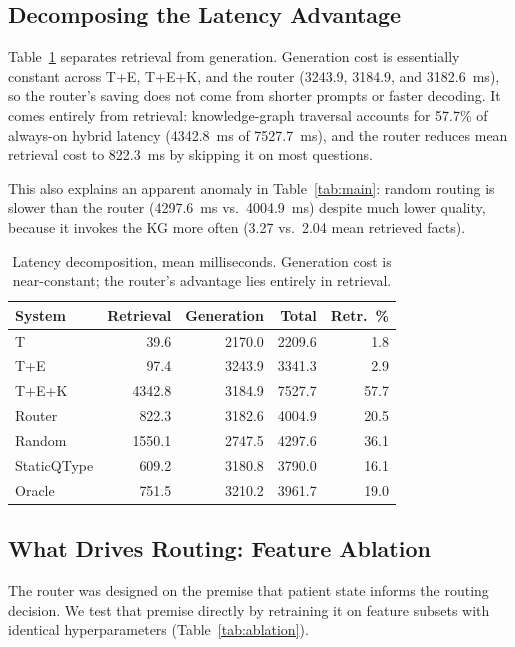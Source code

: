 \documentclass[conference]{IEEEtran}
\begin{document}
\subsection{Decomposing the Latency Advantage}

Table~\ref{tab:latency} separates retrieval from generation. Generation
cost is essentially constant across T+E, T+E+K, and the router
(3243.9, 3184.9, and 3182.6~ms), so the router's saving does not come
from shorter prompts or faster decoding. It comes entirely from
retrieval: knowledge-graph traversal accounts for 57.7\% of always-on
hybrid latency (4342.8~ms of 7527.7~ms), and the router reduces mean
retrieval cost to 822.3~ms by skipping it on most questions.

This also explains an apparent anomaly in Table~\ref{tab:main}: random
routing is slower than the router (4297.6~ms vs.\ 4004.9~ms) despite
much lower quality, because it invokes the KG more often (3.27 vs.\
2.04 mean retrieved facts).

\begin{table}[t]
\centering
\footnotesize
\setlength{\tabcolsep}{4pt}
\caption{Latency decomposition, mean milliseconds. Generation cost is near-constant; the router's advantage lies entirely in retrieval.}
\label{tab:latency}
\begin{tabular}{lrrrr}
\toprule
System & Retrieval & Generation & Total & Retr.~\% \\
\midrule
T           &   39.6 & 2170.0 & 2209.6 &  1.8 \\
T+E         &   97.4 & 3243.9 & 3341.3 &  2.9 \\
T+E+K       & 4342.8 & 3184.9 & 7527.7 & 57.7 \\
Router      &  822.3 & 3182.6 & 4004.9 & 20.5 \\
Random      & 1550.1 & 2747.5 & 4297.6 & 36.1 \\
StaticQType &  609.2 & 3180.8 & 3790.0 & 16.1 \\
Oracle      &  751.5 & 3210.2 & 3961.7 & 19.0 \\
\bottomrule
\end{tabular}
\end{table}

\subsection{What Drives Routing: Feature Ablation}
\label{sec:ablation}

The router was designed on the premise that patient state informs the
routing decision. We test that premise directly by retraining it on
feature subsets with identical hyperparameters
(Table~\ref{tab:ablation}).
\end{document}

